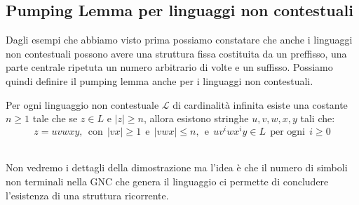 \subsection{Pumping Lemma per linguaggi non contestuali}
Dagli esempi che abbiamo visto prima possiamo constatare che anche i linguaggi non contestuali possono avere una struttura fissa
costituita da un preffisso, una parte centrale ripetuta un numero arbitrario di volte e un suffisso. Possiamo quindi definire il 
pumping lemma anche per i linguaggi non contestuali.\smallskip\\
\colorbox{SALZO}{\parbox{\dimexpr\linewidth-2\fboxsep}{\begin{lemma}
   Per ogni linguaggio non contestuale $\mathcal{L}$ di cardinalità infinita esiste una costante $n \ge 1$ tale che se $ z \in L$ e $|z| \ge n$, allora esistono stringhe 
   $u,v,w,x,y$ tali che:
   \[ z = uvwxy,\ \ \text{con} \ \ |vx| \ge 1 \ \ \text{e} \ \ |vwx | \le n, \ \ \text{e} \ \ uv^i wx^i y \in L \ \ \text{per ogni} \ \ i \ge 0        \]
\end{lemma}}} \smallskip\\
Non vedremo i dettagli della dimostrazione ma l'idea è che il numero di simboli non terminali nella GNC che genera il linguaggio ci permette di concludere l'esistenza di una struttura ricorrente.
